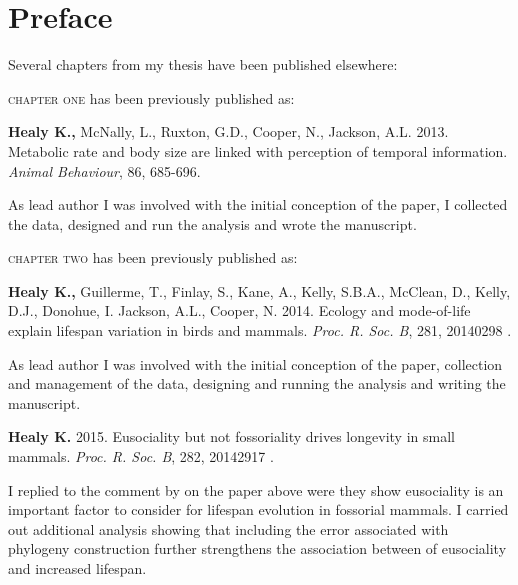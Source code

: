 \chapter*{Preface} %

Several chapters from my thesis have been published elsewhere:

\textsc{chapter one} has been previously published as:
%
\begin{previouspaper}
  \textbf{Healy K.,} McNally, L., Ruxton, G.D., Cooper, N., Jackson, A.L. 2013. Metabolic rate and body size are linked with perception of temporal information. \textit{Animal Behaviour}, 86, 685-696.
\end{previouspaper}
 
As lead author I was involved with the initial conception of the paper, I collected the data, designed and run the analysis and wrote the manuscript.


{}
\textsc{chapter two} has been previously published as:
%
\begin{previouspaper}
  \textbf{Healy K.,} Guillerme, T., Finlay, S., Kane, A., Kelly, S.B.A., McClean, D., Kelly, D.J., Donohue, I. Jackson, A.L., Cooper, N. 2014. Ecology and mode-of-life explain lifespan variation in birds and mammals. \textit{Proc. R. Soc. B}, 281, 20140298 .
\end{previouspaper}

As lead author I was involved with the initial conception of the paper, collection and management of the data, designing and running the analysis and writing the manuscript.

\begin{previouspaper}
  \textbf{Healy K.} 2015. Eusociality but not fossoriality drives longevity in small mammals. \textit{Proc. R. Soc. B}, 282, 20142917 .
\end{previouspaper}

I replied to the comment by \citep{williams2015ecology} on the paper above were they show eusociality is an important factor to consider for lifespan evolution in fossorial mammals. I carried out additional analysis showing that including the error associated with phylogeny construction further strengthens the association between of eusociality and increased lifespan.


